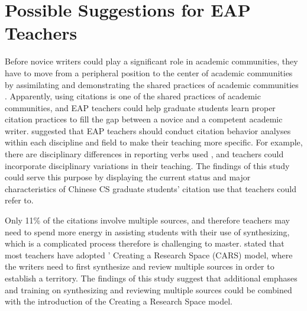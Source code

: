 \section{Possible Suggestions for EAP Teachers}

Before novice writers could play a significant role in academic communities, they have to move from a peripheral position to the center of academic communities by assimilating and demonstrating the shared practices of academic communities \citep{mansourizadeh_citation_2011}. Apparently, using citations is one of the shared practices of academic communities, and EAP teachers could help graduate students learn proper citation practices to fill the gap between a novice and a competent academic writer. \citet{kwan_investigation_2014} suggested that EAP teachers should conduct citation behavior analyses within each discipline and field to make their teaching more specific. For example, there are disciplinary differences in reporting verbs used \citep{davis_development_2013}, and teachers could incorporate disciplinary variations in their teaching. The findings of this study could serve this purpose by displaying the current status and major characteristics of Chinese CS graduate students’ citation use that teachers could refer to.

Only 11\% of the citations involve multiple sources, and therefore teachers may need to spend more energy in assisting students with their use of synthesizing, which is a complicated process \citep{bereiter_psychology_2013,hyland_drawing_2009,kirkland_maximizing_1991,kwan_investigation_2014,mayes_quotation_1990,segev-miller_cognitive_2007} therefore is challenging to master. \citet{davis_development_2013} stated that most teachers have adopted \citeauthor{swales_genre_1990}’ \citeyearpar{swales_genre_1990} Creating a Research Space (CARS) model, where the writers need to first synthesize and review multiple sources in order to establish a territory. The findings of this study suggest that additional emphases and training on synthesizing and reviewing multiple sources could be combined with the introduction of the Creating a Research Space model.

